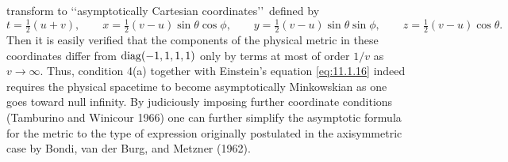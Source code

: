 transform to \lq\lq asymptotically Cartesian coordinates\rq\rq\ defined by
\[
  t=\tfrac12(u+v),\qquad
  x=\tfrac12(v-u)\sin\theta\cos\phi,\qquad
  y=\tfrac12(v-u)\sin\theta\sin\phi,\qquad
  z=\tfrac12(v-u)\cos\theta.
\]
Then it is easily verified that the components of the physical metric in these
coordinates differ from \(\operatorname{diag}(-1,1,1,1)\) only by terms at most of order \(1/v\) as
\(v\to\infty\). Thus, condition 4(a) together with Einstein's equation
\eqref{eq:11.1.16} indeed requires the physical spacetime to become asymptotically
Minkowskian as one goes toward null infinity. By judiciously imposing further
coordinate conditions (Tamburino and Winicour 1966) one can further simplify the
asymptotic formula for the metric to the type of expression originally postulated in
the axisymmetric case by Bondi, van der Burg, and Metzner (1962).

